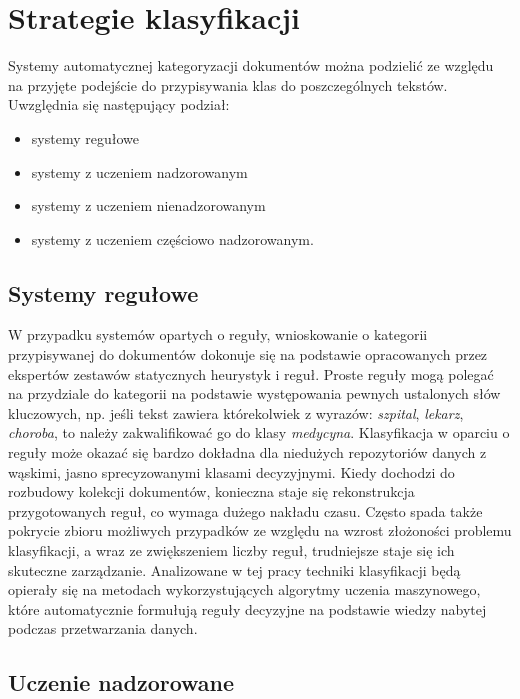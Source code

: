 \documentclass{pracamgr}
\begin{document}
\section{Strategie klasyfikacji}
Systemy automatycznej kategoryzacji dokumentów można podzielić ze względu na przyjęte podejście do przypisywania klas do poszczególnych tekstów. Uwzględnia się następujący podział:

\begin{itemize}
    \item systemy regułowe
    \item systemy z uczeniem nadzorowanym
    \item systemy z uczeniem nienadzorowanym
    \item systemy z uczeniem częściowo nadzorowanym.
\end{itemize}

\subsection{Systemy regułowe}

W przypadku systemów opartych o reguły, wnioskowanie o kategorii przypisywanej do dokumentów dokonuje się na podstawie opracowanych przez ekspertów zestawów statycznych heurystyk i reguł. Proste reguły mogą polegać na przydziale do kategorii na podstawie występowania pewnych ustalonych słów kluczowych, np. jeśli tekst zawiera którekolwiek z wyrazów: \textit{szpital}, \textit{lekarz}, \textit
{choroba}, to należy zakwalifikować go do klasy \textit{medycyna}. Klasyfikacja w oparciu o reguły może okazać się bardzo dokładna dla niedużych repozytoriów danych z wąskimi, jasno sprecyzowanymi klasami decyzyjnymi. Kiedy dochodzi do rozbudowy kolekcji dokumentów, konieczna staje się rekonstrukcja przygotowanych reguł, co wymaga dużego nakładu czasu. Często spada także pokrycie zbioru możliwych przypadków ze względu na wzrost złożoności problemu klasyfikacji, a wraz ze zwiększeniem liczby reguł, trudniejsze staje się ich skuteczne zarządzanie. Analizowane w tej pracy techniki klasyfikacji będą opierały się na metodach wykorzystujących algorytmy uczenia maszynowego, które automatycznie formułują reguły decyzyjne na podstawie wiedzy nabytej podczas przetwarzania danych.

\subsection{Uczenie nadzorowane}
\end{document}
